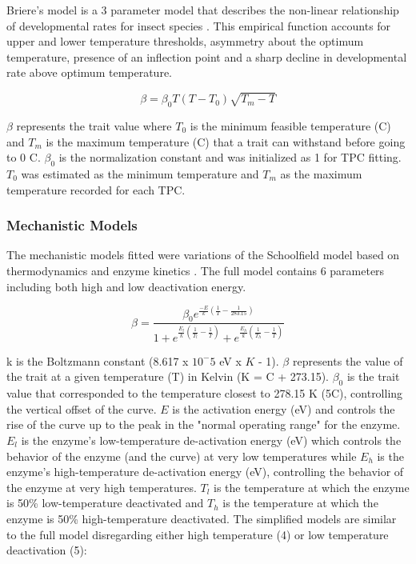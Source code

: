 \documentclass[11pt]{article}
\begin{document}
\begin{linenumbers}
Briere's model is a 3 parameter model that describes the non-linear relationship of developmental rates for insect species \cite{10.1093/ee/28.1.22}. This empirical function accounts for upper and lower temperature thresholds, asymmetry about the optimum temperature, presence of an inflection point and a sharp decline in developmental rate above optimum temperature. 

\begin{equation}
\beta = \beta_0 T (T-T_0) \sqrt{T_m-T}\tag{2}
\end{equation}

\(\beta\) represents the trait value where \(T_0\) is the minimum feasible temperature (\degree C) and \(T_m\) is the maximum temperature (\degree C) that a trait can withstand before going to 0 \degree C. \(\beta_0\) is the normalization constant and was initialized as 1 for TPC fitting. \(T_0\) was estimated as the minimum temperature and \(T_m\) as the maximum temperature recorded for each TPC.

\subsubsection{Mechanistic Models}
The mechanistic models fitted were variations of the Schoolfield model based on thermodynamics and enzyme kinetics \cite{Schoolfield1981}. The full model contains 6 parameters including both high and low deactivation energy.

\begin{equation}
\beta = \frac{\beta_0 e^{\frac{-E}{k} (\frac{1}{T} - \frac{1}{283.15})}}
{ 1 + e^{\frac{E_l}{k} (\frac{1}{T_l} - \frac{1}{T})} + 
	e^{\frac{E_h}{k} (\frac{1}{T_h} - \frac{1}{T})}}\tag{3}
\end{equation}
\vspace{0.1cm}

k is the Boltzmann constant (8.617 x $10^-5$ eV x \(K\) - 1).  \(\beta\) represents the value of the trait at a given temperature (T) in Kelvin (K = \degree C + 273.15). \(\beta_0\) is the trait value that corresponded to the temperature closest to 278.15 K (5\degree C), controlling the vertical offset of the curve. \(E\) is  the activation energy (eV) and controls the rise of the curve up to the peak in the "normal operating range" for the enzyme. \(E_l\) is the enzyme's low-temperature de-activation energy (eV) which controls the behavior of the enzyme (and the curve) at very low temperatures while \(E_h\) is the enzyme's high-temperature de-activation energy (eV), controlling the behavior of the enzyme at very high temperatures. \(T_l\) is the temperature at which the enzyme is 50\% low-temperature deactivated and \(T_h\)  is the temperature at which the enzyme is 50\% high-temperature deactivated. The simplified models are similar to the full model disregarding either high temperature (4) or low temperature deactivation (5):


\end{linenumbers}
\end{document}
